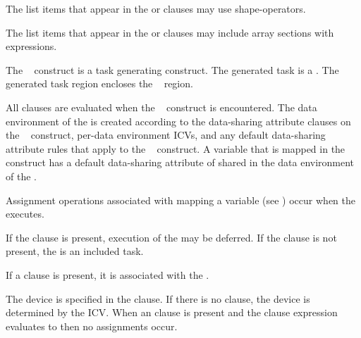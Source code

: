 \begin{ccppspecific}
The list items that appear in the  or  clauses may
use shape-operators.
\end{ccppspecific}

The list items that appear in the  or  clauses may
include array sections with  expressions.

The ~ construct is a task generating construct.  The generated task is a .  The generated task region encloses the ~ region.

All clauses are evaluated when the ~ construct is encountered.  The data environment of the  is created according to the data-sharing attribute clauses on the ~ construct, per-data environment ICVs, and any default data-sharing attribute rules that apply to the ~ construct.  A variable that is mapped in the ~ construct has a default data-sharing attribute of shared in the data environment of the .

Assignment operations associated with mapping a variable (see ) occur when the  executes.

If the  clause is present, execution of the  may be deferred.  If the  clause is not present, the  is an included task.

If a  clause is present, it is associated with the .

The device is specified in the  clause. If there is no  clause, the device
is determined by the  ICV. When an  clause is present and the 
clause expression evaluates to  then no assignments occur.

{}

